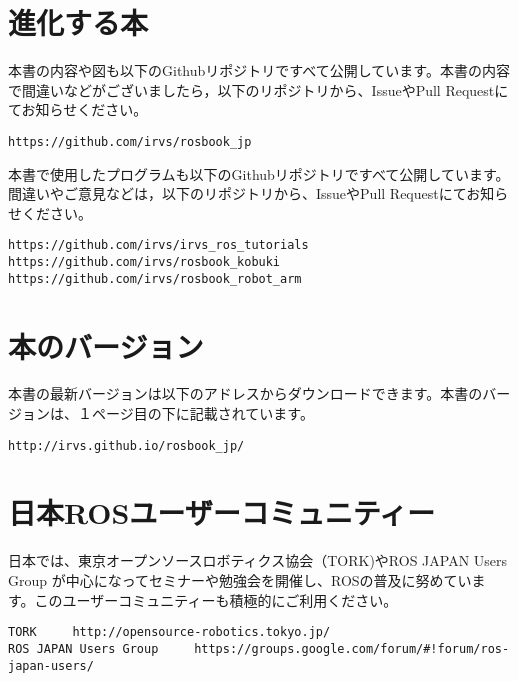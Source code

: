 \section*{進化する本}

本書の内容や図も以下のGithubリポジトリですべて公開しています。本書の内容で間違いなどがございましたら，以下のリポジトリから、IssueやPull Requestにてお知らせください。

\begin{lstlisting}
https://github.com/irvs/rosbook_jp
\end{lstlisting}

\noindent 本書で使用したプログラムも以下のGithubリポジトリですべて公開しています。間違いやご意見などは，以下のリポジトリから、IssueやPull Requestにてお知らせください。

\begin{lstlisting}
https://github.com/irvs/irvs_ros_tutorials
https://github.com/irvs/rosbook_kobuki
https://github.com/irvs/rosbook_robot_arm
\end{lstlisting}

\section*{本のバージョン}

本書の最新バージョンは以下のアドレスからダウンロードできます。本書のバージョンは、１ページ目の下に記載されています。

\begin{lstlisting}
http://irvs.github.io/rosbook_jp/
\end{lstlisting}

\section*{日本ROSユーザーコミュニティー}

日本では、東京オープンソースロボティクス協会（TORK)やROS JAPAN Users Group が中心になってセミナーや勉強会を開催し、ROSの普及に努めています。このユーザーコミュニティーも積極的にご利用ください。

\begin{lstlisting}
TORK     http://opensource-robotics.tokyo.jp/
ROS JAPAN Users Group     https://groups.google.com/forum/#!forum/ros-japan-users/
\end{lstlisting}

